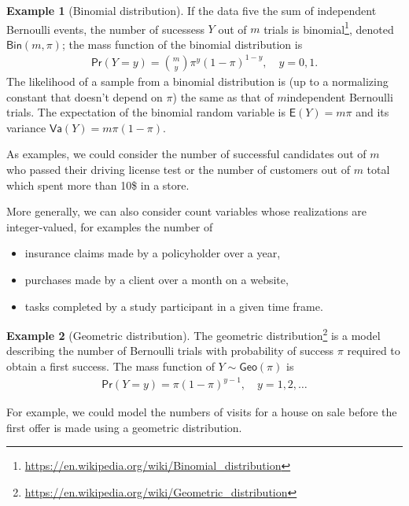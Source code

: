 \documentclass[
  11pt,
  letterpaper,
]{book}
\providecommand{\tightlist}{%
  \setlength{\itemsep}{0pt}\setlength{\parskip}{0pt}}
\renewcommand{\href}[2]{#2\footnote{\url{#1}}}
\theoremstyle{definition}
\theoremstyle{definition}
\newtheorem{example}{Example}[chapter]
\theoremstyle{definition}
\theoremstyle{remark}
\begin{document}
\begin{example}[Binomial distribution]
\protect\hypertarget{exm:binomialdist}{}{\label{exm:binomialdist} {} }If the data five the sum of independent Bernoulli events, the number of sucessess \(Y\) out of \(m\) trials is \href{https://en.wikipedia.org/wiki/Binomial_distribution}{binomial}, denoted \(\mathsf{Bin}(m, \pi)\); the mass function of the binomial distribution is
\begin{align*}
\mathsf{Pr}(Y=y) = \binom{m}{y}\pi^y (1-\pi)^{1-y}, \quad y=0, 1.
\end{align*}
The likelihood of a sample from a binomial distribution is (up to a normalizing constant that doesn't depend on \(\pi\)) the same as that of \(m\)independent Bernoulli trials. The expectation of the binomial random variable is \(\mathsf{E}(Y)=m\pi\) and its variance \(\mathsf{Va}(Y)=m\pi(1-\pi)\).

As examples, we could consider the number of successful candidates out of \(m\) who passed their driving license test or the number of customers out of \(m\) total which spent more than 10\$ in a store.
\end{example}

More generally, we can also consider count variables whose realizations are integer-valued, for examples the number of

\begin{itemize}
\tightlist
\item
  insurance claims made by a policyholder over a year,
\item
  purchases made by a client over a month on a website,
\item
  tasks completed by a study participant in a given time frame.
\end{itemize}

\begin{example}[Geometric distribution]
\protect\hypertarget{exm:geomdist}{}{\label{exm:geomdist} {} }The \href{https://en.wikipedia.org/wiki/Geometric_distribution}{geometric distribution} is a model describing the number of Bernoulli trials with probability of success \(\pi\) required to obtain a first success. The mass function of \(Y \sim \mathsf{Geo}(\pi)\) is
\begin{align*}
\mathsf{Pr}(Y=y) = \pi (1-\pi)^{y-1}, \quad y=1,2, \ldots
\end{align*}

For example, we could model the numbers of visits for a house on sale before the first offer is made using a geometric distribution.
\end{example}
\end{document}
